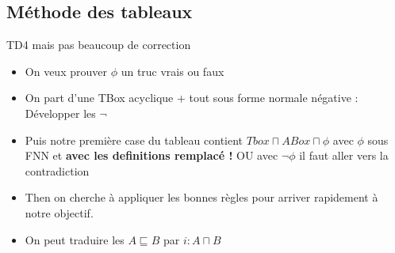 \documentclass{article}
\theoremstyle{plain}%
\theoremstyle{definition}
\theoremstyle{remark}
\begin{document}
\subsection{Méthode des tableaux}
TD4 mais pas beaucoup de correction
\begin{itemize}
    \item On veux prouver $ \phi  $  un truc vrais ou faux
    \item On part d'une TBox acyclique + tout sous forme normale négative : Développer les $ \neg  $ 
    \item Puis notre première case du tableau contient $ Tbox \sqcap ABox \sqcap \phi  $ avec $ \phi  $ sous FNN et \textbf{avec les definitions remplacé !} OU avec $ \neg \phi  $ il faut aller vers la contradiction  
    \item Then on cherche à appliquer les bonnes règles pour arriver rapidement à notre objectif.
    \item On peut traduire les $ A \sqsubseteq B $ par $ i: A \sqcap B $ 
\end{itemize}
\end{document}
